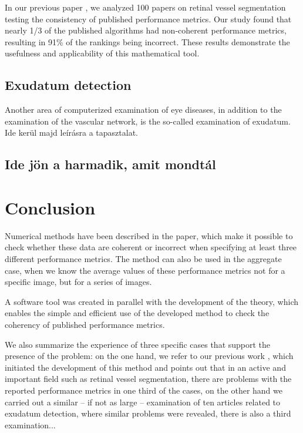 \documentclass[3p,times]{elsarticle}
\begin{document}
In our previous paper \cite{7}, we analyzed 100 papers on retinal vessel segmentation testing the consistency of published performance metrics. Our study found that nearly 1/3 of the published algorithms had non-coherent performance metrics, resulting in 91\% of the rankings being incorrect. These results demonstrate the usefulness and applicability of this mathematical tool.

\subsection{Exudatum detection}
Another area of computerized examination of eye diseases, in addition to the examination of the vascular network, is the so-called examination of exudatum. Ide kerül majd leírásra a tapasztalat.


\subsection{Ide jön a harmadik, amit mondtál}


\section{Conclusion}
Numerical methods have been described in the paper, which make it possible to check whether these data are coherent or incorrect when specifying at least three different performance metrics. The method can also be used in the aggregate case, when we know the average values of these performance metrics not for a specific image, but for a series of images.

A software tool was created in parallel with the development of the theory, which enables the simple and efficient use of the developed method to check the coherency of published performance metrics.

We also summarize the experience of three specific cases that support the presence of the problem: on the one hand, we refer to our previous work \cite{7}, which initiated the development of this method and points out that in an active and important field such as retinal vessel segmentation, there are problems with the reported performance metrics in one third of the cases, on the other hand we carried out a similar -- if not as large -- examination of ten articles related to exudatum detection, where similar problems were revealed, there is also a third examination... 




% 



\end{document}
